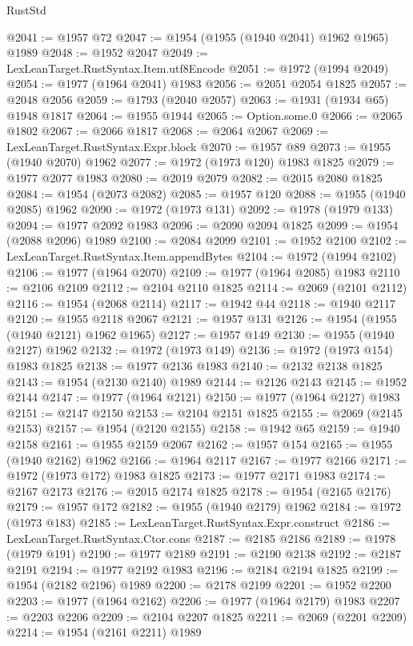 \begin{lexlean}{RustStd}
\begin{coremodule}
@2041 := @1957 @72
@2047 := @1954 (@1955 (@1940 @2041) @1962 @1965) @1989
@2048 := @1952 @2047
@2049 := LexLeanTarget.RustSyntax.Item.utf8Encode
@2051 := @1972 (@1994 @2049)
@2054 := @1977 (@1964 @2041) @1983
@2056 := @2051 @2054 @1825
@2057 := @2048 @2056
@2059 := @1793 (@2040 @2057)
@2063 := @1931 (@1934 @65) @1948 @1817
@2064 := @1955 @1944
@2065 := Option.some.{0}
@2066 := @2065 @1802
@2067 := @2066 @1817
@2068 := @2064 @2067
@2069 := LexLeanTarget.RustSyntax.Expr.block
@2070 := @1957 @89
@2073 := @1955 (@1940 @2070) @1962
@2077 := @1972 (@1973 @120) @1983 @1825
@2079 := @1977 @2077 @1983
@2080 := @2019 @2079
@2082 := @2015 @2080 @1825
@2084 := @1954 (@2073 @2082)
@2085 := @1957 @120
@2088 := @1955 (@1940 @2085) @1962
@2090 := @1972 (@1973 @131)
@2092 := @1978 (@1979 @133)
@2094 := @1977 @2092 @1983
@2096 := @2090 @2094 @1825
@2099 := @1954 (@2088 @2096) @1989
@2100 := @2084 @2099
@2101 := @1952 @2100
@2102 := LexLeanTarget.RustSyntax.Item.appendBytes
@2104 := @1972 (@1994 @2102)
@2106 := @1977 (@1964 @2070)
@2109 := @1977 (@1964 @2085) @1983
@2110 := @2106 @2109
@2112 := @2104 @2110 @1825
@2114 := @2069 (@2101 @2112)
@2116 := @1954 (@2068 @2114)
@2117 := @1942 @44
@2118 := @1940 @2117
@2120 := @1955 @2118 @2067
@2121 := @1957 @131
@2126 := @1954 (@1955 (@1940 @2121) @1962 @1965)
@2127 := @1957 @149
@2130 := @1955 (@1940 @2127) @1962
@2132 := @1972 (@1973 @149)
@2136 := @1972 (@1973 @154) @1983 @1825
@2138 := @1977 @2136 @1983
@2140 := @2132 @2138 @1825
@2143 := @1954 (@2130 @2140) @1989
@2144 := @2126 @2143
@2145 := @1952 @2144
@2147 := @1977 (@1964 @2121)
@2150 := @1977 (@1964 @2127) @1983
@2151 := @2147 @2150
@2153 := @2104 @2151 @1825
@2155 := @2069 (@2145 @2153)
@2157 := @1954 (@2120 @2155)
@2158 := @1942 @65
@2159 := @1940 @2158
@2161 := @1955 @2159 @2067
@2162 := @1957 @154
@2165 := @1955 (@1940 @2162) @1962
@2166 := @1964 @2117
@2167 := @1977 @2166
@2171 := @1972 (@1973 @172) @1983 @1825
@2173 := @1977 @2171 @1983
@2174 := @2167 @2173
@2176 := @2015 @2174 @1825
@2178 := @1954 (@2165 @2176)
@2179 := @1957 @172
@2182 := @1955 (@1940 @2179) @1962
@2184 := @1972 (@1973 @183)
@2185 := LexLeanTarget.RustSyntax.Expr.construct
@2186 := LexLeanTarget.RustSyntax.Ctor.cons
@2187 := @2185 @2186
@2189 := @1978 (@1979 @191)
@2190 := @1977 @2189
@2191 := @2190 @2138
@2192 := @2187 @2191
@2194 := @1977 @2192 @1983
@2196 := @2184 @2194 @1825
@2199 := @1954 (@2182 @2196) @1989
@2200 := @2178 @2199
@2201 := @1952 @2200
@2203 := @1977 (@1964 @2162)
@2206 := @1977 (@1964 @2179) @1983
@2207 := @2203 @2206
@2209 := @2104 @2207 @1825
@2211 := @2069 (@2201 @2209)
@2214 := @1954 (@2161 @2211) @1989

\end{coremodule}
\end{lexlean}
